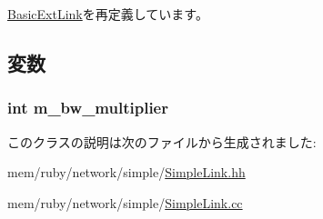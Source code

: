\hyperlink{classBasicExtLink_acd2b8699ab7559c0da687cd775e2c778}{BasicExtLink}を再定義しています。

\subsection{変数}
\hypertarget{classSimpleExtLink_a543e68bab5d8c6ed00c96039e2ef62fd}{
\subsubsection[{m\_\-bw\_\-multiplier}]{\setlength{\rightskip}{0pt plus 5cm}int {\bf m\_\-bw\_\-multiplier}}}
\label{classSimpleExtLink_a543e68bab5d8c6ed00c96039e2ef62fd}


このクラスの説明は次のファイルから生成されました:\begin{DoxyCompactItemize}
\item 
mem/ruby/network/simple/\hyperlink{SimpleLink_8hh}{SimpleLink.hh}\item 
mem/ruby/network/simple/\hyperlink{SimpleLink_8cc}{SimpleLink.cc}\end{DoxyCompactItemize}
